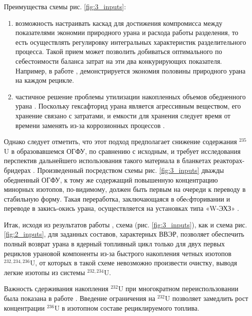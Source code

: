 Преимущества схемы рис. \ref{fig:3_inputs}:

\begin{enumerate}
  \item возможность настраивать каскад для достижения компромисса между показателями экономии природного урана и расхода работы разделения, то есть осуществлять регулировку интегральных характеристик разделительного процесса. Такой прием может позволить добиваться оптимального по себестоимости баланса затрат на эти два конкурирующих показателя. Например, в работе \cite{smirnovApplyingEnrichmentCapacities2018}, демонстрируется экономия половины природного урана на каждом рецикле.
  \item частичное решение проблемы утилизации накопленных объемов обедненного урана \cite{smirnovEnrichmentRegeneratedUranium2014}. Поскольку гексафторид урана является агрессивным веществом, его хранение связано с затратами, и емкости для хранения следует время от времени заменять из-за коррозионных процессов \cite{fitchOPTIONSDISPOSALREAPPLICATION2009, oecdManagementDepletedUranium2001}.
\end{enumerate}

Однако следует отметить, что этот подход предполагает снижение содержания $^{235}$U в образовавшемся ОГФУ, по сравнению с исходным, и требует исследования перспектив дальнейшего использования такого материала в бланкетах реакторах-бридерах \cite{smirnovApplyingEnrichmentCapacities2018}.
Произведенный посредством схемы рис. \ref{fig:3_inputs} дважды обедненный ОГФУ, к тому же содержащий повышенную концентрацию минорных изотопов, по-видимому, должен быть первым на очереди к переводу в стабильную форму. Такая переработка, заключающаяся в обеcфторивании и переводе в закись-окись урана, осуществляется на установках типа «W-ЭХЗ» \cite{PererabotkaOGFUObrazovaniem2014}.

Итак, исходя из результатов работы \cite{smirnovApplyingEnrichmentCapacities2018}, схема (рис. \ref{fig:3_inputs}), как и схема рис. \ref{fig:2_inputs}, для заданных составов, характерных ВВЭР, позволяет обеспечить полный возврат урана в ядерный топливный цикл только для двух первых рециклов урановой компоненты из-за быстрого накопления четных изотопов  $^{232,234,236}$U, от которых в такой схеме невозможно произвести очистку, выводя легкие изотопы из системы $^{232,234}$U.

Важность сдерживания накопления $^{232}$U при многократном переиспользовании была показана в работе \cite{smirnovEvolutionIsotopicComposition2012}. Введение ограничения на $^{232}$U позволяет замедлить рост концентрации $^{236}$U в изотопном составе рециклируемого топлива.

